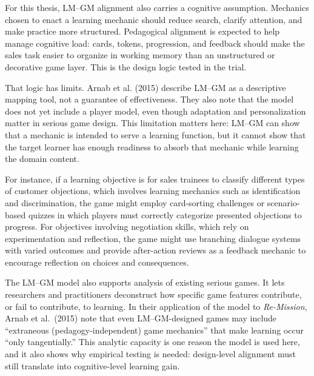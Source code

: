 \documentclass[12pt]{report}
\begin{document}
For this thesis, LM--GM alignment also carries a cognitive assumption. Mechanics chosen to enact a learning mechanic should reduce search, clarify attention, and make practice more structured. Pedagogical alignment is expected to help manage cognitive load: cards, tokens, progression, and feedback should make the sales task easier to organize in working memory than an unstructured or decorative game layer. This is the design logic tested in the trial.

That logic has limits. Arnab et al. (2015) describe LM--GM as a descriptive mapping tool, not a guarantee of effectiveness. They also note that the model does not yet include a player model, even though adaptation and personalization matter in serious game design. This limitation matters here: LM--GM can show that a mechanic is intended to serve a learning function, but it cannot show that the target learner has enough readiness to absorb that mechanic while learning the domain content.

For instance, if a learning objective is for sales trainees to classify different types of customer objections, which involves learning mechanics such as identification and discrimination, the game might employ card-sorting challenges or scenario-based quizzes in which players must correctly categorize presented objections to progress. For objectives involving negotiation skills, which rely on experimentation and reflection, the game might use branching dialogue systems with varied outcomes and provide after-action reviews as a feedback mechanic to encourage reflection on choices and consequences.

The LM--GM model also supports analysis of existing serious games. It lets researchers and practitioners deconstruct how specific game features contribute, or fail to contribute, to learning. In their application of the model to \textit{Re-Mission}, Arnab et al.\ (2015) note that even LM--GM-designed games may include ``extraneous (pedagogy-independent) game mechanics'' that make learning occur ``only tangentially.'' This analytic capacity is one reason the model is used here, and it also shows why empirical testing is needed: design-level alignment must still translate into cognitive-level learning gain.
\end{document}
